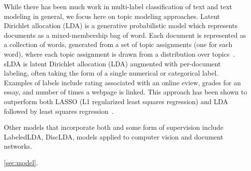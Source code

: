 While there has been much work in multi-label classification of text and
text modeling in general, we focus here on topic modeling approaches.
Latent Dirichlet allocation (LDA) is a generative probabilistic model which
represents documents as a mixed-membership bag of word. Each document is
represented as a collection of words, generated from a set of topic assignments
(one for each word), where each topic assignment is drawn from a distribution
over topics~\citep{Blei2003}. sLDA is latent Dirichlet allocation (LDA)
\cite{Blei2003} augmented with per-document labeling, often taking the form of
a single numerical or categorical label. Examples of labels include rating
associated with an online  eview, grades for an essay, and number of times a
webpage is linked. This approach has been shown to outperform both LASSO
(L1 regularized least squares regression) and LDA followed by least
squares regression~\cite{BleiMcAuliffe2008}.



Other models that incorporate both and some form of supervision include
LabeledLDA\citep{Ramage2009}, DiscLDA\citep{DiscLDA}, models applied to 
computer vision and document networks\citep{wangbleifeifei08,RelationalLDA}. 

\ref{sec:model}.

